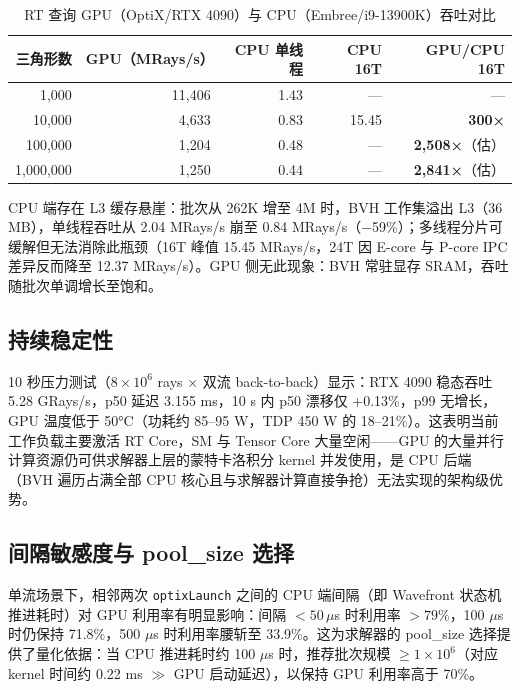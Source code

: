 \begin{table}[htbp]
  \centering
  \caption{RT 查询 GPU（OptiX/RTX 4090）与 CPU（Embree/i9-13900K）吞吐对比}
  \label{tab:rt_gpu_cpu}
  \begin{tabular}{rrrrr}
    \toprule
    三角形数 & GPU（MRays/s） & CPU 单线程 & CPU 16T & GPU/CPU 16T \\
    \midrule
    1,000    & 11,406 & 1.43 & — & — \\
    10,000   & 4,633  & 0.83 & 15.45 & \textbf{300×} \\
    100,000  & 1,204  & 0.48 & — & \textbf{2,508×}（估） \\
    1,000,000 & 1,250 & 0.44 & — & \textbf{2,841×}（估） \\
    \bottomrule
  \end{tabular}
\end{table}

CPU 端存在 L3 缓存悬崖：批次从 262K 增至 4M 时，BVH 工作集溢出 L3（36 MB），单线程吞吐从 2.04 MRays/s 崩至 0.84 MRays/s（−59\%）；多线程分片可缓解但无法消除此瓶颈（16T 峰值 15.45 MRays/s，24T 因 E-core 与 P-core IPC 差异反而降至 12.37 MRays/s）。GPU 侧无此现象：BVH 常驻显存 SRAM，吞吐随批次单调增长至饱和。

\subsection{持续稳定性}

10 秒压力测试（$8 \times 10^6$ rays × 双流 back-to-back）显示：RTX 4090 稳态吞吐 5.28 GRays/s，p50 延迟 3.155 ms，10 s 内 p50 漂移仅 +0.13\%，p99 无增长，GPU 温度低于 50°C（功耗约 85--95 W，TDP 450 W 的 18--21\%）。这表明当前工作负载主要激活 RT Core，SM 与 Tensor Core 大量空闲——GPU 的大量并行计算资源仍可供求解器上层的蒙特卡洛积分 kernel 并发使用，是 CPU 后端（BVH 遍历占满全部 CPU 核心且与求解器计算直接争抢）无法实现的架构级优势。

\subsection{间隔敏感度与 pool\_size 选择}

单流场景下，相邻两次 \texttt{optixLaunch} 之间的 CPU 端间隔（即 Wavefront 状态机推进耗时）对 GPU 利用率有明显影响：间隔 $< 50\,\mu$s 时利用率 $> 79\%$，100 $\mu$s 时仍保持 71.8\%，500 $\mu$s 时利用率腰斩至 33.9\%。这为求解器的 pool\_size 选择提供了量化依据：当 CPU 推进耗时约 100 $\mu$s 时，推荐批次规模 $\ge 1 \times 10^6$（对应 kernel 时间约 0.22 ms $\gg$ GPU 启动延迟），以保持 GPU 利用率高于 70\%。

